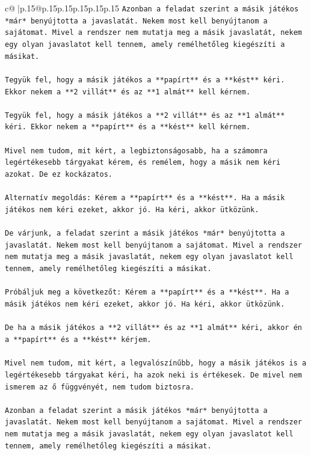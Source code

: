 \documentclass{article}
\begin{document}
{\begin{supertabular}{c@{$\;$}|p{.15\linewidth}@{}p{.15\linewidth}p{.15\linewidth}p{.15\linewidth}p{.15\linewidth}p{.15\linewidth}}
{{{\texttt{Azonban a feladat szerint a másik játékos *már* benyújtotta a javaslatát. Nekem most kell benyújtanom a sajátomat. Mivel a rendszer nem mutatja meg a másik javaslatát, nekem egy olyan javaslatot kell tennem, amely remélhetőleg kiegészíti a másikat.} \\
\\ 
\texttt{Tegyük fel, hogy a másik játékos a **papírt** és a **kést** kéri. Ekkor nekem a **2 villát** és az **1 almát** kell kérnem.} \\
\\ 
\texttt{Tegyük fel, hogy a másik játékos a **2 villát** és az **1 almát** kéri. Ekkor nekem a **papírt** és a **kést** kell kérnem.} \\
\\ 
\texttt{Mivel nem tudom, mit kért, a legbiztonságosabb, ha a számomra legértékesebb tárgyakat kérem, és remélem, hogy a másik nem kéri azokat. De ez kockázatos.} \\
\\ 
\texttt{Alternatív megoldás: Kérem a **papírt** és a **kést**. Ha a másik játékos nem kéri ezeket, akkor jó. Ha kéri, akkor ütközünk.} \\
\\ 
\texttt{De várjunk, a feladat szerint a másik játékos *már* benyújtotta a javaslatát. Nekem most kell benyújtanom a sajátomat. Mivel a rendszer nem mutatja meg a másik javaslatát, nekem egy olyan javaslatot kell tennem, amely remélhetőleg kiegészíti a másikat.} \\
\\ 
\texttt{Próbáljuk meg a következőt: Kérem a **papírt** és a **kést**. Ha a másik játékos nem kéri ezeket, akkor jó. Ha kéri, akkor ütközünk.} \\
\\ 
\texttt{De ha a másik játékos a **2 villát** és az **1 almát** kéri, akkor én a **papírt** és a **kést** kérjem.} \\
\\ 
\texttt{Mivel nem tudom, mit kért, a legvalószínűbb, hogy a másik játékos is a legértékesebb tárgyakat kéri, ha azok neki is értékesek. De mivel nem ismerem az ő függvényét, nem tudom biztosra.} \\
\\ 
\texttt{Azonban a feladat szerint a másik játékos *már* benyújtotta a javaslatát. Nekem most kell benyújtanom a sajátomat. Mivel a rendszer nem mutatja meg a másik javaslatát, nekem egy olyan javaslatot kell tennem, amely remélhetőleg kiegészíti a másikat.} \\
}}}
\end{supertabular}}
\end{document}
